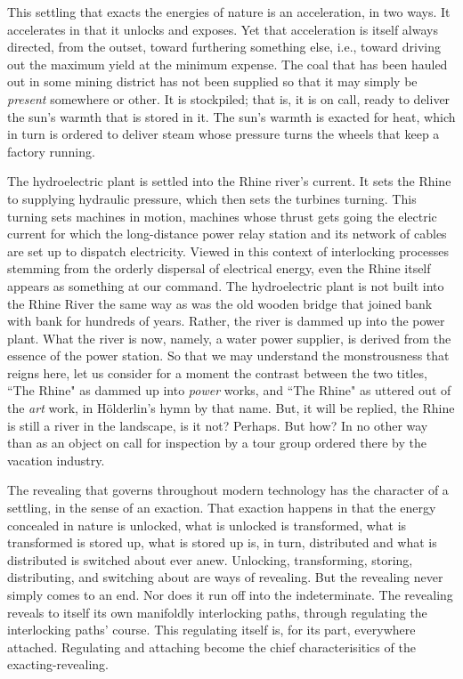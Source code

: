 \documentclass[12pt]{article}
\begin{document}
This settling that exacts the energies of nature is an acceleration, in two ways. It accelerates in that it unlocks and exposes. Yet that acceleration is itself always directed, from the outset, toward furthering something else, i.e., toward driving out the maximum yield at the minimum expense. The coal that has been hauled out in some mining district has not been supplied so that it may simply be \textit{present} somewhere or other. It is stockpiled; that is, it is on call, ready to deliver the sun's warmth that is stored in it. The sun's warmth is exacted for heat, which in turn is ordered to deliver steam whose pressure turns the wheels that keep a factory running.

The hydroelectric plant is settled into the Rhine river's current. It sets the Rhine to supplying hydraulic pressure, which then sets the turbines turning. This turning sets machines in motion, machines whose thrust gets going the electric current for which the long-distance power relay station and its network of cables are set up to dispatch electricity. Viewed in this context of interlocking processes stemming from the orderly dispersal of electrical energy, even the Rhine itself appears as something at our command. The hydroelectric plant is not built into the Rhine River the same way as was the old wooden bridge that joined bank with bank for hundreds of years. Rather, the river is dammed up into the power plant. What the river is now, namely, a water power supplier, is derived from the essence of the power station. So that we may understand the monstrousness that reigns here, let us consider for a moment the contrast between the two titles, ``The Rhine" as dammed up into \textit{power} works, and ``The Rhine" as uttered out of the \textit{art} work, in H{\"o}lderlin's hymn by that name. But, it will be replied, the Rhine is still a river in the landscape, is it not? Perhaps. But how? In no other way than as an object on call for inspection by a tour group ordered there by the vacation industry.

The revealing that governs throughout modern technology has the character of a settling, in the sense of an exaction. That exaction happens in that the energy concealed in nature is unlocked, what is unlocked is transformed, what is transformed is stored up, what is stored up is, in turn, distributed and what is distributed is switched about ever anew. Unlocking, transforming, storing, distributing, and switching about are ways of revealing. But the revealing never simply comes to an end. Nor does it run off into the indeterminate. The revealing reveals to itself its own manifoldly interlocking paths, through regulating the interlocking paths' course. This regulating itself is, for its part, everywhere attached. Regulating and attaching become the chief characterisitics of the exacting-revealing.
\end{document}
